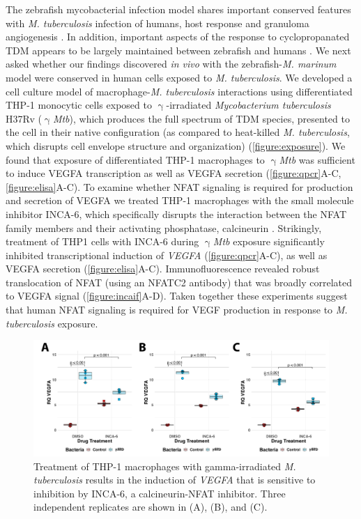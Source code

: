 The zebrafish mycobacterial infection model shares important conserved features with \textit{M. tuberculosis} infection of humans, host response and granuloma angiogenesis \citep{Swaim2006, Datta2015, Oehlers2015, Cronan2021}. In addition, important aspects of the response to cyclopropanated TDM appears to be largely maintained between zebrafish and humans \citep{Walton2018}. We next asked whether our findings discovered \textit{in vivo} with the zebrafish-\textit{M. marinum} model were conserved in human cells exposed to \textit{M. tuberculosis}. We developed a cell culture model of macrophage-\textit{M. tuberculosis} interactions using differentiated THP-1 monocytic cells exposed to $\upgamma$-irradiated \textit{Mycobacterium tuberculosis} H37Rv ($\upgamma$\textit{Mtb}), which produces the full spectrum of TDM species, presented to the cell in their native configuration (as compared to heat-killed \textit{M. tuberculosis}, which disrupts cell envelope structure and organization) \citep{Romero2014, SecanellaFandos2014} (\autoref{figure:exposure}). We found that exposure of differentiated THP-1 macrophages to $\upgamma$\textit{Mtb} was sufficient to induce VEGFA transcription as well as VEGFA secretion (\autoref{figure:qpcr}A-C, \autoref{figure:elisa}A-C). To examine whether NFAT signaling is required for production and secretion of VEGFA we treated THP-1 macrophages with the small molecule inhibitor INCA-6, which specifically disrupts the interaction between the NFAT family members and their activating phosphatase, calcineurin \citep{Roehrl2004}. Strikingly, treatment of THP1 cells with INCA-6 during $\upgamma$\textit{Mtb} exposure significantly inhibited transcriptional induction of \textit{VEGFA} (\autoref{figure:qpcr}A-C), as well as VEGFA secretion (\autoref{figure:elisa}A-C). Immunofluorescence revealed robust translocation of NFAT (using an NFATC2 antibody) that was broadly correlated to VEGFA signal (\autoref{figure:incaif}A-D). Taken together these experiments suggest that human NFAT signaling is required for VEGF production in response to \textit{M. tuberculosis} exposure.

\begin{figure}
\centering
\includegraphics[width=\textwidth]{images/incaqpcr.pdf}
\caption{Treatment of THP-1 macrophages with gamma-irradiated \textit{M. tuberculosis} results in the induction of \textit{VEGFA} that is sensitive to inhibition by INCA-6, a calcineurin-NFAT inhibitor. Three independent replicates are shown in (A), (B), and (C).}
\label{figure:qpcr}

\end{figure}

